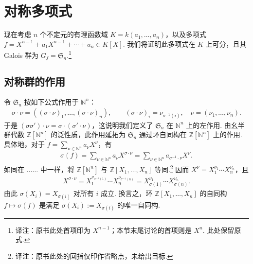 \section{对称多项式}\label{sec:galois-2-9}
现在考虑 $n$ 个不定元的有理函数域 $K=k(a_1,\ldots,a_n)$，以及多项式 $f=X^{n-1}+a_1X^{n-1}+\cdots+a_n\in K[X]$. 我们将证明此多项式在 $K$ 上可分，且其 Galois 群为 $G_f=\mathfrak S_n$.\footnote{译注：原书此处首项印为 $X^{n-1}$；本节末尾讨论的首项则是 $X^n$. 此处保留原式.}
\subsection{对称群的作用}\label{sec:galois-2-9-1}
令 $\mathfrak S_n$ 按如下公式作用于 $\mathbb N^n$：
\begin{align*}
\sigma\cdot\nu=((\sigma\cdot\nu)_1,\ldots,(\sigma\cdot\nu)_n),\qquad (\sigma\cdot\nu)_i=\nu_{\sigma^{-1}(i)},\quad \nu=(\nu_1,\ldots,\nu_n).
\end{align*}
于是 $(\sigma\sigma')\cdot\nu=\sigma\cdot(\sigma'\cdot\nu)$，这说明我们定义了 $\mathfrak S_n$ 在 $\mathbb N^n$ 上的左作用.
由幺半群代数 $\mathbb Z[\mathbb N^n]$ 的泛性质，此作用延拓为 $\mathfrak S_n$ 通过环自同构在 $\mathbb Z[\mathbb N^n]$ 上的作用. 具体地，对于 $f=\sum_{\nu\in\mathbb N^n}a_\nu X^\nu$，有
\begin{align*}
\sigma(f)=\sum_{\nu\in\mathbb N^n}a_\nu X^{\sigma\cdot\nu}=\sum_{\nu\in\mathbb N^n}a_{\sigma^{-1}\cdot\nu}X^\nu.
\end{align*}
如同在 $\ldots\ldots$ 中一样，将 $\mathbb Z[\mathbb N^n]$ 与 $\mathbb Z[X_1,\ldots,X_n]$ 等同.\footnote{译注：原书此处的回指仅印作省略点，未给出目标.} 因而 $X^\nu=X_1^{\nu_1}\cdots X_n^{\nu_n}$，且
\begin{align*}
X^{\sigma\cdot\nu}=X_1^{\nu_{\sigma^{-1}(1)}}\cdots X_n^{\nu_{\sigma^{-1}(n)}}=X_{\sigma(1)}^{\nu_1}\cdots X_{\sigma(n)}^{\nu_n}.
\end{align*}
由此 $\sigma(X_i)=X_{\sigma(i)}$ 对所有 $i$ 成立. 换言之，环 $\mathbb Z[X_1,\ldots,X_n]$ 的自同构 $f\mapsto\sigma(f)$ 是满足 $\sigma(X_i):=X_{\sigma(i)}$ 的唯一自同构.
